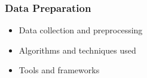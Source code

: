 \begin{frame}
    \frametitle{Data Preparation}
    \begin{itemize}
        \item Data collection and preprocessing
        \item Algorithms and techniques used
        \item Tools and frameworks
    \end{itemize}
\end{frame}